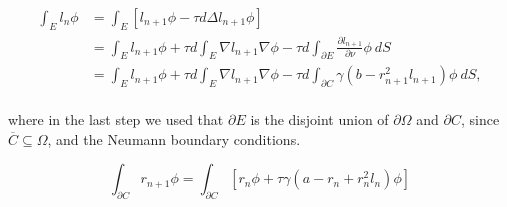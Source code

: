 \documentclass{book}
\theoremstyle{definition}
\begin{document}
\begin{equation}
    \begin{aligned}
        \int_{E} l_n \phi &= \int_{E} \left[ l_{n + 1} \phi - \tau d \Delta l_{n + 1} \phi \right] \\
        &= \int_{E} l_{n + 1} \phi + \tau d \int_{E} \nabla l_{n + 1} \nabla \phi - \tau d \int_{\partial E} \frac{\partial l_{n + 1}}{\partial \nu} \phi\ dS \\
        &= \int_{E} l_{n + 1} \phi + \tau d \int_{E} \nabla l_{n + 1} \nabla \phi - \tau d \int_{\partial C} \gamma (b - r_{n + 1}^{2}l_{n + 1}) \phi\ dS, \\
    \end{aligned}
\end{equation}

\noindent
where in the last step we used that $\partial E$ is the disjoint union of $\partial \Omega$ and $\partial C$, since $\overline{C} \subseteq \Omega$, and the Neumann boundary conditions.

\begin{equation}
    \int_{\partial C} r_{n + 1} \phi = \int_{\partial C} \left[ r_{n} \phi + \tau \gamma \left( a - r_{n} + r_{n}^{2}l_{n} \right) \phi \right]
\end{equation}
\end{document}

